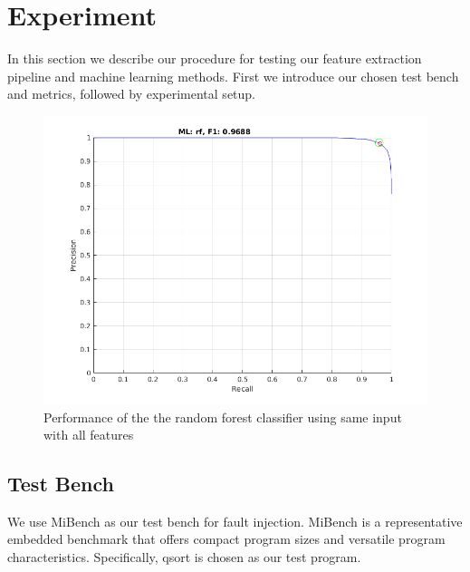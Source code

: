 \section{Experiment}
In this section we describe our procedure for testing our feature extraction pipeline and machine learning methods. First we introduce our chosen test bench and metrics, followed by experimental setup.

\begin{figure}[t]
\begin{center}
   \includegraphics[width=0.8\linewidth]{./figures/siaf.png}
\end{center}
   \vspace{-0.5cm}
   \caption{Performance of the the random forest classifier using same input with all features}
   \vspace{-0.3cm}
\label{fig:siaf}
\end{figure}

\subsection{Test Bench}
We use MiBench \cite{guthaus2001mibench} as our test bench for fault injection. MiBench is a representative embedded benchmark that offers compact program sizes and versatile program characteristics. Specifically, qsort is chosen as our test program.

